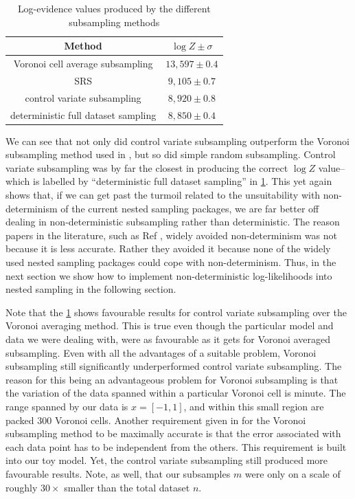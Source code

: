 \begin{table}[h!]
\begin{center}
\begin{tabular}{c|c}
Method                              & $\log Z \pm \sigma$ \\
\hline
Voronoi cell average subsampling    & $13,597 \pm 0.4$    \\
SRS                                 & $9,105 \pm 0.7$     \\
control variate subsampling         & $8,920 \pm 0.8$     \\
deterministic full dataset sampling & $8,850 \pm 0.4$    
\end{tabular}
\end{center}
\caption{Log-evidence values produced by the different subsampling methods\label{tab:subsampling}}
\end{table}

We can see that not only did control variate subsampling outperform the Voronoi subsampling method used in \cite{Mihaylov_2020}, but so did simple random subsampling. Control variate subsampling was by far the closest in producing the correct $\log Z$ value--which is labelled by ``deterministic full dataset sampling'' in \cref{tab:subsampling}. This yet again shows that, if we can get past the turmoil related to the unsuitability with non-determinism of the current nested sampling packages, we are far better off dealing in non-deterministic subsampling rather than deterministic. The reason papers in the literature, such as Ref \cite{Mihaylov_2020}, widely avoided non-determinism was not because it is less accurate. Rather they avoided it because none of the widely used nested sampling packages could cope with non-determinism. Thus, in the next section we show how to implement non-deterministic log-likelihoods into nested sampling in the following section.

Note that the \cref{tab:subsampling} shows favourable results for control variate subsampling over the Voronoi averaging method. This is true even though the particular model and data we were dealing with, were as favourable as it gets for Voronoi averaged subsampling. Even with all the advantages of a suitable problem, Voronoi subsampling still significantly underperformed control variate subsampling. The reason for this being an advantageous problem for Voronoi subsampling is that the variation of the data spanned within a particular Voronoi cell is minute. The range spanned by our data is $x=[-1,1]$, and within this small region are packed $300$ Voronoi cells. Another requirement given in \cite{Mihaylov_2020} for the Voronoi subsampling method to be maximally accurate is that the error associated with each data point has to be independent from the others. This requirement is built into our toy model. Yet, the control variate subsampling still produced more favourable results. Note, as well, that our subsamples $m$ were only on a scale of roughly $30 \times$ smaller than the total dataset $n$. 





